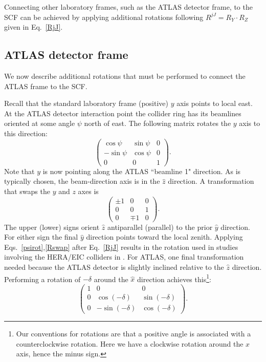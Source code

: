 Connecting other laboratory frames, 
such as the ATLAS detector frame, to the SCF can be achieved by 
applying additional rotations following $R^{jJ} = R_Y\cdot R_Z$ given in Eq.~\eqref{RjJ}.
%
%
\subsection{ATLAS detector frame}
%
We now describe additional rotations that must be performed to
connect the ATLAS frame to the SCF. 

Recall that the standard laboratory frame (positive) $y$ axis
points to local east.
At the ATLAS detector interaction point the collider ring
has its beamlines oriented at some angle $\psi$ north of east.
The following matrix rotates the $y$ axis to this direction:
%
\begin{equation}
\label{psirot}
\begin{pmatrix} \cos\psi & \sin\psi & 0 \\ 
-\sin\psi& \cos\psi& 0 \\ 0 & 0 & 1 \end{pmatrix}.
\end{equation}
%
Note that $y$ is now pointing along 
the ATLAS ``beamline 1" direction.
As is typically chosen, the beam-direction
axis is in the $\widehat{z}$ direction. A transformation
that swaps the $y$ and $z$ axes is 
%
\begin{equation}
\label{Rswap}
\begin{pmatrix} \pm 1 & 0 & 0
\\ 0 & 0 & 1 \\ 0 & \mp 1 & 0 
\end{pmatrix}.
\end{equation}
%
The upper (lower) signs orient $\widehat{z}$ antiparallel (parallel) 
to the prior $\widehat{y}$ direction. 
For either sign the final $\widehat{y}$ 
direction points toward the local zenith.
Applying Eqs.~\eqref{psirot},\eqref{Rswap} after
Eq.~\eqref{RjJ} results in the rotation used in studies involving the 
HERA/EIC colliders in \cite{klv17, ls18}. For ATLAS, 
one final transformation needed because the ATLAS detector 
is slightly inclined relative to the $\widehat{z}$
direction. Performing a rotation of $-\delta$ around the $\widehat{x}$
direction achieves 
this\footnote{Our conventions for rotations are that
a positive angle is associated with a counterclockwise rotation. Here
we have a clockwise rotation around the $x$ axis, hence the minus sign.}:
%
\begin{equation}
\begin{pmatrix} 1 & 0 & 0 \\ 0 & \cos(-\delta) & \sin(-\delta) \\ 
0 & -\sin(-\delta)& \cos(-\delta) \end{pmatrix}.
\end{equation}
%

